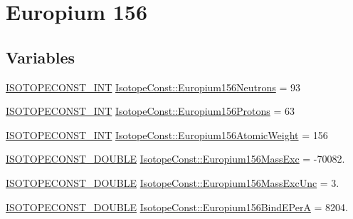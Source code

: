\hypertarget{group___isotope_const-_europium-_eu156}{}\section{Europium 156}
\label{group___isotope_const-_europium-_eu156}
\subsection*{Variables}
\begin{DoxyCompactItemize}
\item 
\mbox{\hyperlink{group___isotope_const-_macros_ga5f18360b3e99483a35c32d789e62621c}{I\+S\+O\+T\+O\+P\+E\+C\+O\+N\+S\+T\+\_\+\+I\+NT}} \mbox{\hyperlink{group___isotope_const-_europium-_eu156_ga1a7bc1d5af1b7dcddac25a30e4aa9eb1}{Isotope\+Const\+::\+Europium156\+Neutrons}} = 93
\item 
\mbox{\hyperlink{group___isotope_const-_macros_ga5f18360b3e99483a35c32d789e62621c}{I\+S\+O\+T\+O\+P\+E\+C\+O\+N\+S\+T\+\_\+\+I\+NT}} \mbox{\hyperlink{group___isotope_const-_europium-_eu156_ga9073d8b89b1c19b9315b3d05d7d68136}{Isotope\+Const\+::\+Europium156\+Protons}} = 63
\item 
\mbox{\hyperlink{group___isotope_const-_macros_ga5f18360b3e99483a35c32d789e62621c}{I\+S\+O\+T\+O\+P\+E\+C\+O\+N\+S\+T\+\_\+\+I\+NT}} \mbox{\hyperlink{group___isotope_const-_europium-_eu156_gaf32ca63dcbc5211d1117de3a03aedd03}{Isotope\+Const\+::\+Europium156\+Atomic\+Weight}} = 156
\item 
\mbox{\hyperlink{group___isotope_const-_macros_ga8f45a7272ce02c0b4c65c44636ed719a}{I\+S\+O\+T\+O\+P\+E\+C\+O\+N\+S\+T\+\_\+\+D\+O\+U\+B\+LE}} \mbox{\hyperlink{group___isotope_const-_europium-_eu156_gaa043a7ec4530db2da90cb2b0bd75bfd7}{Isotope\+Const\+::\+Europium156\+Mass\+Exc}} = -\/70082.
\item 
\mbox{\hyperlink{group___isotope_const-_macros_ga8f45a7272ce02c0b4c65c44636ed719a}{I\+S\+O\+T\+O\+P\+E\+C\+O\+N\+S\+T\+\_\+\+D\+O\+U\+B\+LE}} \mbox{\hyperlink{group___isotope_const-_europium-_eu156_ga9556d0aa210801d92fd897b7c4d75371}{Isotope\+Const\+::\+Europium156\+Mass\+Exc\+Unc}} = 3.
\item 
\mbox{\hyperlink{group___isotope_const-_macros_ga8f45a7272ce02c0b4c65c44636ed719a}{I\+S\+O\+T\+O\+P\+E\+C\+O\+N\+S\+T\+\_\+\+D\+O\+U\+B\+LE}} \mbox{\hyperlink{group___isotope_const-_europium-_eu156_ga558dfb820778f32cf9480c0dd2360488}{Isotope\+Const\+::\+Europium156\+Bind\+E\+PerA}} = 8204.
\item 

\end{DoxyCompactItemize}

